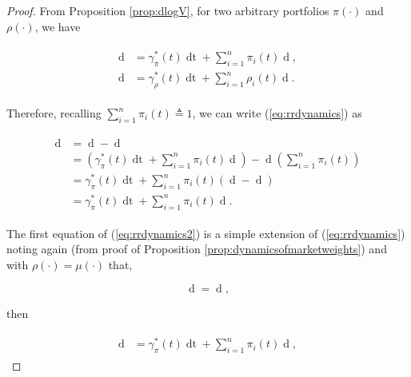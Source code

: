 \documentclass[british]{amsart} \usepackage{lmodern}
\numberwithin{equation}{section} \numberwithin{figure}{section}
\theoremstyle{plain} \newtheorem{thm}{\protect\theoremname}[section]
\theoremstyle{definition} \newtheorem{defn}[thm]{\protect\definitionname}
\theoremstyle{plain} \newtheorem{assumption}[thm]{\protect\assumptionname}
\theoremstyle{plain} \newtheorem{lem}[thm]{\protect\lemmaname}
\theoremstyle{plain} \newtheorem{prop}[thm]{\protect\propositionname}
\theoremstyle{remark} \newtheorem{rem}[thm]{\protect\remarkname}
\theoremstyle{plain} \newtheorem{cor}[thm]{\protect\corollaryname}
\renewcommand{\d}[1]{\mathop{\mathrm{d}{#1}}}
\newcommand{\defeq}{\mathop{\triangleq}} \newcommand{\almostsurely}{\text{a.s.}}
\newcommand{\Vmu}{V^{\mu}}
\begin{document}
\begin{proof}

  From Proposition \ref{prop:dlogV}, for two arbitrary portfolios $\pi(\cdot)$
  and $\rho(\cdot)$, we have

  \begin{gather} 
    \begin{split} 
      \d{\log V^{\pi}(t)} &= 
          \gamma_{\pi}^{*}(t)\d{t} + \sum_{i=1}^{n} \pi_{i}(t)\d{\log{X_{i}(t)}}, \\
      \d{\log V^{\rho}(t)} &= 
          \gamma_{\rho}^{*}(t)\d{t} + \sum_{i=1}^{n} \rho_{i}(t) \d{\log{X_{i}(t)}}.
     \end{split} 
  \end{gather}

  Therefore, recalling $\sum_{i=1}^{n} \pi_{i}(t) \defeq 1$, we can write (\ref{eq:rrdynamics}) as

  \begin{gather*} 
    \begin{split} 
      \d{\log{ \left( \frac{ V^{\pi}(t) }{V^{\rho}(t) } \right) }} 
      &=  \d{\log V^{\pi}(t)} - \d{\log V^{\rho}(t)} \\
      &=  \left( 
              \gamma_{\pi}^{*}(t)\d{t} + \sum_{i=1}^{n} \pi_{i}(t) \d{\log{X_{i}(t)}} 
          \right)
          - \d{\log V^{\rho}(t)} 
          \left(
            \sum_{i=1}^{n} \pi_{i}(t) 
          \right) \\
      &=  \gamma_{\pi}^{*}(t)\d{t} + 
              \sum_{i=1}^{n} \pi_{i}(t) 
          \left( 
                  \d{\log{X_{i}(t)}} - \d{\log V^{\rho}(t)} 
          \right) \\
      &=  \gamma_{\pi}^{*}(t)\d{t} + \sum_{i=1}^{n} \pi_{i}(t) 
           \d{\log{ \left( \frac{ X_{i}(t) }{ V^{\rho}(t)} \right) }}.
    \end{split} 
  \end{gather*}

  The first equation of (\ref{eq:rrdynamics2}) is a simple extension of
  (\ref{eq:rrdynamics}) noting again (from proof of Proposition
  \ref{prop:dynamicsofmarketweights}) and with $\rho(\cdot)=\mu(\cdot)$ that,

  \begin{equation*} 
      \d{\log{\mu_{i}(t)}} 
        = \d{\log{ \left( \frac{ X_{i}(t) }{ \Vmu(t) } \right)}},
  \end{equation*}

  then

  \begin{gather} 
    \label{eq:eqrrdynamicseq1}
    \begin{split} 
      \d{\log{ \left( \frac{ V^{\pi}(t) }{V^{\rho}(t) } \right) }} 
      &=  \gamma_{\pi}^{*}(t)\d{t} + \sum_{i=1}^{n}\pi_{i}(t)\d{\log{\mu_{i}(t)}},
    \end{split} 
  \end{gather}


\end{proof}
\end{document}
